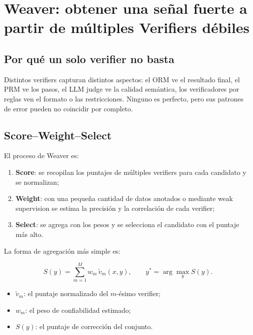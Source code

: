 \section{Weaver: obtener una señal fuerte a partir de múltiples Verifiers débiles}

\subsection{Por qué un solo verifier no basta}

Distintos verifiers capturan distintos aspectos: el ORM ve el resultado final, el PRM ve los pasos, el LLM judge ve la calidad semántica, los verificadores por reglas ven el formato o las restricciones. Ninguno es perfecto, pero sus patrones de error pueden no coincidir por completo.


\subsection{Score--Weight--Select}

El proceso de Weaver es:

\begin{enumerate}
    \item \textbf{Score}: se recopilan los puntajes de múltiples verifiers para cada candidato y se normalizan;
    \item \textbf{Weight}: con una pequeña cantidad de datos anotados o mediante weak supervision se estima la precisión y la correlación de cada verifier;
    \item \textbf{Select}: se agrega con los pesos y se selecciona el candidato con el puntaje más alto.
\end{enumerate}


La forma de agregación más simple es:

$$
S(y)=\sum_{m=1}^{M} w_m\,\tilde v_m(x,y),
\qquad
 y^*=\arg\max_y S(y).
$$

\begin{itemize}
    \item $\tilde v_m$: el puntaje normalizado del $m$-ésimo verifier;
    \item $w_m$: el peso de confiabilidad estimado;
    \item $S(y)$: el puntaje de corrección del conjunto.
\end{itemize}

